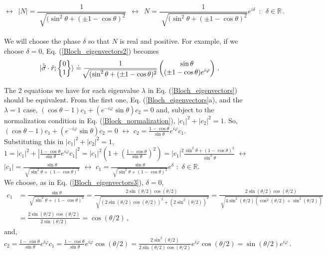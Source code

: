 \documentclass[11pt]{article}
\numberwithin{equation}{section} %
\numberwithin{figure}{section} %
\begin{document}
\begin{appendices}
 $$\leftrightarrow\,\,\,|N|=\frac{1}{\sqrt[]{(\sin^2\theta+(\pm 1-\cos\theta)^2}}\,\,\,\leftrightarrow\,\,\,N=\frac{1}{\sqrt[]{(\sin^2\theta+(\pm 1-\cos\theta)^2}}e^{i\delta}\,\,\,:\,\,\,\delta\in\mathbb{R}\,\textrm{.}$$\\
 
We will choose the phase $\delta$ so that $N$ is real and positive. For example,  if we choose $\delta=0$, Eq. (\ref{Bloch_eigenvectors2}) becomes
\begin{equation} \label{Bloch_eigenvectors3}
\ket{\hat{\vec{\sigma}}\cdot\hat{r};\begin{Bmatrix}0\\1\end{Bmatrix}}\doteq \frac{1}{\sqrt[]{(\sin^2\theta+(\pm 1-\cos\theta)^2}}\begin{pmatrix}\sin\theta\\(\pm 1-\cos\theta)e^{i\varphi}\end{pmatrix}\,\textrm{.}
\end{equation}

\vspace{0.5cm}

The 2 equations we have for each eigenvalue $\lambda$ in Eq. (\ref{Bloch_eigenvectors}) should be equivalent. From the first one, Eq. (\ref{Bloch_eigenvectors}a), and the $\lambda=1$ case, $(\cos\theta- 1)c_1+(e^{-i\varphi}\sin\theta)c_2=0$ and, subject to the normalization condition in Eq. (\ref{Block_normalization}), $|c_1|^2+|c_2|^2=1$. So, $(\cos\theta-1)c_1+(e^{-i\varphi}\sin\theta)c_2=0$ $\leftrightarrow$ $c_2=\frac{1-\cos\theta}{\sin\theta}e^{i\varphi}c_1$. \\

Substituting this in $|c_1|^2+|c_2|^2=1$, $1=|c_1|^2+|\frac{1-\cos\theta}{\sin\theta}e^{i\varphi}c_1|^2=|c_1|^2(1+(\frac{1-\cos\theta}{\sin\theta})^2)=|c_1|^2\frac{\sin^2\theta+(1-\cos\theta)^2}{\sin^2\theta}$ $\leftrightarrow$ $|c_1|=\frac{\sin\theta}{\sqrt[]{\sin^2\theta+(1-\cos\theta)^2}}$ $\leftrightarrow$ $c_1=\frac{\sin\theta}{\sqrt[]{\sin^2\theta+(1-\cos\theta)^2}}e^{\delta}$ $:$ $\delta\in\mathbb{R}$.\\

\vspace{0.5cm}
 We choose, as in Eq. (\ref{Bloch_eigenvectors3}), $\delta=0$,
\begin{equation}
\begin{split}
 c_1 
 &=\frac{\sin\theta}{\sqrt[]{\sin^2\theta+(1-\cos\theta)^2}}=\frac{2\sin(\theta/2)\cos(\theta/2)}{\sqrt[]{(2\sin(\theta/2)\cos(\theta/2))^2+(2\sin^2(\theta/2))^2}}=\frac{2\sin(\theta/2)\cos(\theta/2)}{\sqrt[]{4\sin^2(\theta/2)(\cos^2(\theta/2)+\sin^2(\theta/2))}}\\
 &=\frac{2\sin(\theta/2)\cos(\theta/2)}{2\sin(\theta/2)}=\cos(\theta/2)\,\textrm{,}
\end{split}
\end{equation} 
and, $c_2=\frac{1-\cos\theta}{\sin\theta}e^{i\varphi}c_1=\frac{1-\cos\theta}{\sin\theta}e^{i\varphi}\cos(\theta/2)=\frac{2\sin^2(\theta/2)}{2\sin(\theta/2)\cos(\theta/2)}e^{i\varphi}\cos(\theta/2)=\sin(\theta/2)e^{i\varphi}\,\textrm{.}$


\end{appendices}
\end{document}

